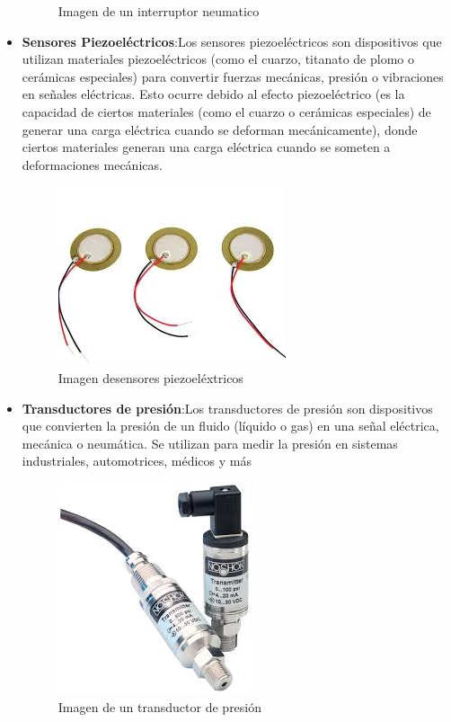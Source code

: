 \begin{itemize}
\begin{figure}[h]
		\caption{Imagen de un interruptor neumatico}
		\label{fig:inem}
	\end{figure}
	\item \textbf{Sensores Piezoeléctricos}:Los sensores piezoeléctricos son dispositivos que utilizan materiales piezoeléctricos (como el cuarzo, titanato de plomo o cerámicas especiales) para convertir fuerzas mecánicas, presión o vibraciones en señales eléctricas. Esto ocurre debido al efecto piezoeléctrico (es la capacidad de ciertos materiales (como el cuarzo o cerámicas especiales) de generar una carga eléctrica cuando se deforman mecánicamente), donde ciertos materiales generan una carga eléctrica cuando se someten a deformaciones mecánicas.\newpage
	\begin{figure}[h]
		\centering
		\includegraphics[width=6 cm]{img/spiez}
		\caption{Imagen desensores piezoeléxtricos}
		\label{fig:spiez}
	\end{figure}
	\item \textbf{Transductores de presión}:Los transductores de presión son dispositivos que convierten la presión de un fluido (líquido o gas) en una señal eléctrica, mecánica o neumática. Se utilizan para medir la presión en sistemas industriales, automotrices, médicos y más
	\begin{figure}[h]
		\centering
		\includegraphics[width=5 cm]{img/tpres}
		\caption{Imagen de un transductor de presión}
		\label{fig:tpres}
	\end{figure}
\end{itemize}

